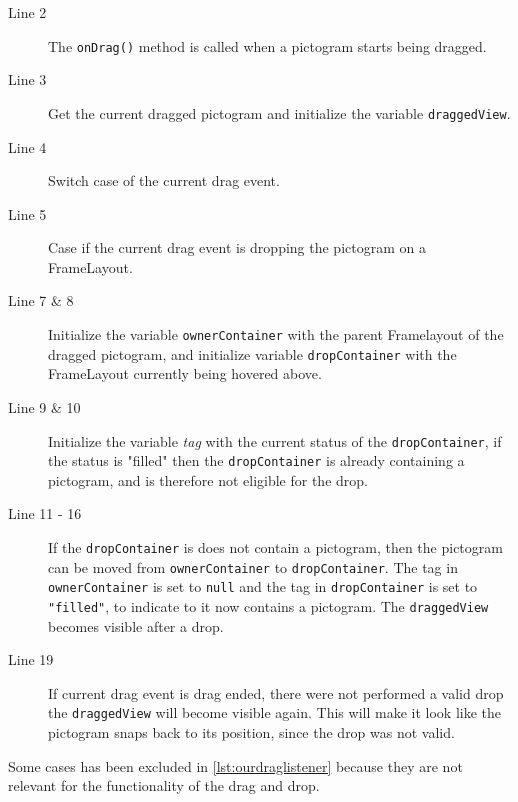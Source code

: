 \begin{description}
\item[Line 2] The \lstinline|onDrag()| method is called when a pictogram starts being dragged.
\item[Line 3] Get the current dragged pictogram and initialize the variable \lstinline|draggedView|.
\item[Line 4] Switch case of the current drag event.
\item[Line 5] Case if the current drag event is dropping the pictogram on a FrameLayout.
\item[Line 7 \& 8] Initialize the variable \lstinline|ownerContainer| with the parent Framelayout of the dragged pictogram, and initialize variable \lstinline|dropContainer| with the FrameLayout currently being hovered above.  
\item[Line 9 \& 10] Initialize the variable \textit{tag} with the current status of the \lstinline|dropContainer|, if the status is "filled" then the \lstinline|dropContainer| is already containing a pictogram, and is therefore not eligible for the drop.
\item[Line 11 - 16] If the \lstinline|dropContainer| is does not contain a pictogram, then the pictogram can be moved from \lstinline|ownerContainer| to \lstinline|dropContainer|. The tag in \lstinline|ownerContainer| is set to \lstinline|null| and the tag in \lstinline|dropContainer| is set to \lstinline|"filled"|, to indicate to it now contains a pictogram. The \lstinline|draggedView| becomes visible after a drop.
\item[Line 19] If current drag event is drag ended,  there were not performed a valid drop the \lstinline|draggedView| will become visible again. This will make it look like the pictogram snaps back to its position, since the drop was not valid.
\end{description}
Some cases has been excluded in \autoref{lst:ourdraglistener} because they are not relevant for the functionality of the drag and drop.
